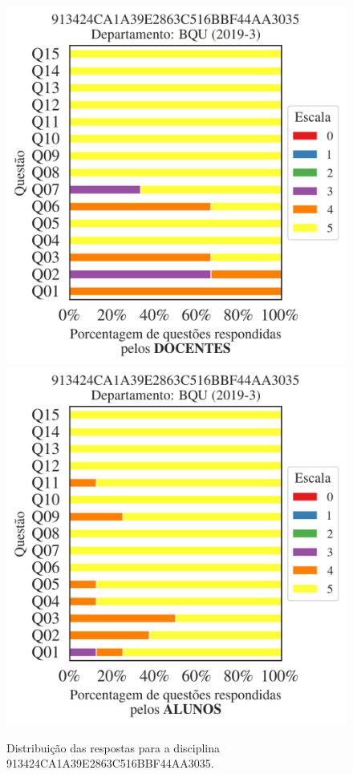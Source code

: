 \documentclass[a4paper,10pt]{article}
\begin{document}
\begin{figure}[h]
\centering
\includegraphics[width=0.485\linewidth]{analise_disciplina_departamento_BQU_913424CA1A39E2863C516BBF44AA3035_docentes.png}
\includegraphics[width=0.485\linewidth]{analise_disciplina_departamento_BQU_913424CA1A39E2863C516BBF44AA3035_alunos.png}
\caption{\label{fig:analise_geral_departamento}                Distribuição das respostas para a disciplina 913424CA1A39E2863C516BBF44AA3035. }
\end{figure}
\end{document}

